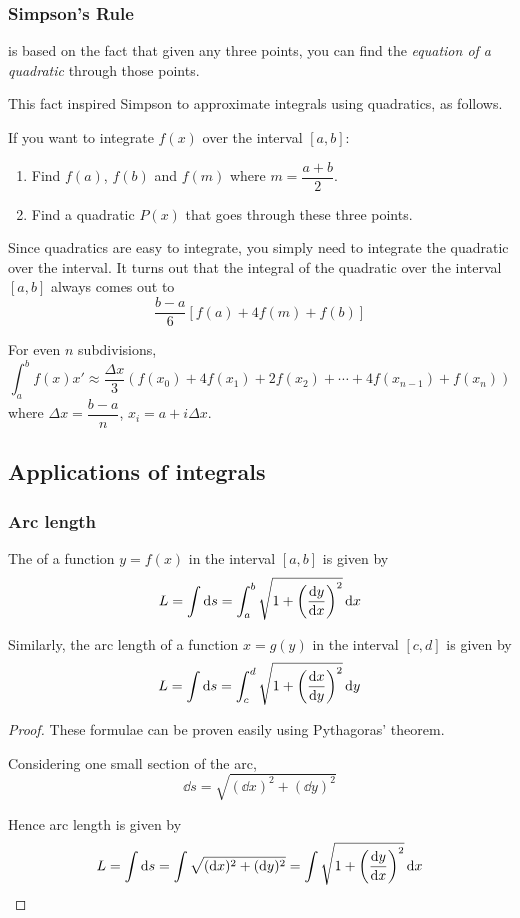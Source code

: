 \subsubsection{Simpson's Rule}
 is based on the fact that given any three points, you can find the \emph{equation of a quadratic} through those points. 

This fact inspired Simpson to approximate integrals using quadratics, as follows.

If you want to integrate $f(x)$ over the interval $[a,b]$:
\begin{enumerate}
\item Find $f(a)$, $f(b)$ and $f(m)$ where $m=\dfrac{a+b}{2}$.
\item Find a quadratic $P(x)$ that goes through these three points.
\end{enumerate}

Since quadratics are easy to integrate, you simply need to integrate the quadratic over the interval. It turns out that the integral of the quadratic over the interval $[a,b]$ always comes out to 
\begin{equation}
\frac{b-a}{6}[f(a)+4f(m)+f(b)]
\end{equation}

For even $n$ subdivisions,
\begin{equation}
\int_a^bf(x)x' \approx \frac {\Delta x}{3} (f(x_0) + 4f(x_1) + 2f(x_2) + \cdots + 4f(x_{n-1} )+ f(x_n))
\end{equation}
where $\Delta x = \dfrac{b-a}{n}$, $x_i =a+ i\Delta x$.

\subsection{Applications of integrals}
\subsubsection{Arc length}
The  of a function $y=f(x)$ in the interval $[a,b]$ is given by
\begin{equation}
L = \int\dd{s} = \int_a^b\sqrt{1+\left(\dv{y}{x}\right)^2}\dd{x}
\end{equation}

Similarly, the arc length of a function $x=g(y)$ in the interval $[c,d]$ is given by
\[ L = \int\dd{s} = \int_c^d\sqrt{1+\left(\dv{x}{y}\right)^2}\dd{y} \]

\begin{proof}
These formulae can be proven easily using Pythagoras' theorem.

Considering one small section of the arc,
\[ \dd{s}=\sqrt{(\dd{x})^2+(\dd{y})^2} \]

Hence arc length is given by
\[ L = \int\dd{s} = \int\sqrt{(\dd{x})^2+(\dd{y})^2} = \int\sqrt{1+\left(\dv{y}{x}\right)^2}\dd{x} \]
\end{proof}

